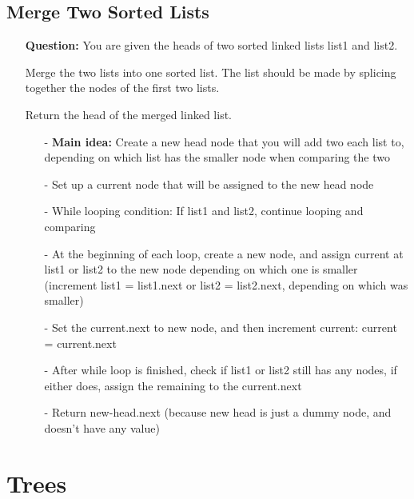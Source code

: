 \documentclass[12pt]{article}
\begin{document}
\subsection{Merge Two Sorted Lists}
\begin{enumerate}
  \item[] \textbf{Question:} You are given the heads of two sorted linked lists list1 and list2.

Merge the two lists into one sorted list. The list should be made by splicing together the nodes of the first two lists.

Return the head of the merged linked list.

    \begin{enumerate}
      \item[-] \textbf{Main idea:} Create a new head node that you will add two each list to, depending on which list has the smaller node when comparing the two
      \item[-] Set up a current node that will be assigned to the new head node
      \item[-] While looping condition: If list1 and list2, continue looping and comparing 
      \item[-] At the beginning of each loop, create a new node, and assign current at list1 or list2 to the new node depending on which one is smaller (increment list1 = list1.next or list2 = list2.next, depending on which was smaller)
      \item[-] Set the current.next to new node, and then increment current: current = current.next 
      \item[-] After while loop is finished, check if list1 or list2 still has any nodes, if either does, assign the remaining to the current.next
      \item[-] Return new-head.next (because new head is just a dummy node, and doesn't have any value)



    \end{enumerate}
\end{enumerate}


\section{Trees}
\end{document}
